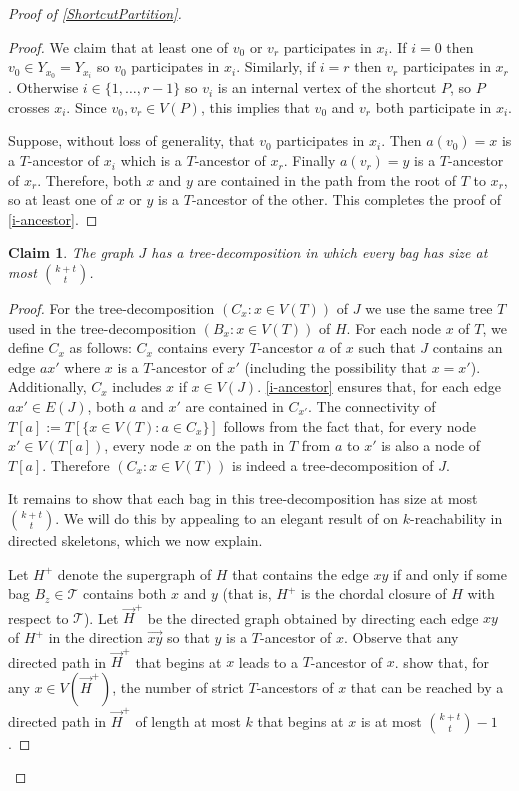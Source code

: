 \documentclass{patmorin}
\theoremstyle{plain}
\newtheorem{clm}{Claim}
\theoremstyle{definition}
\begin{document}
\begin{proof}[Proof of \cref{ShortcutPartition}]
\begin{proof}
  We claim that at least one of $v_0$ or $v_r$ participates in $x_i$.  If $i=0$ then $v_0\in Y_{x_0}=Y_{x_i}$ so $v_0$ participates in $x_i$. Similarly, if $i=r$ then $v_r$ participates in $x_r$.  Otherwise $i\in\{1,\ldots,r-1\}$ so $v_i$ is an internal vertex of the shortcut $P$, so $P$ crosses $x_i$.  Since $v_0,v_r\in V(P)$, this implies that $v_0$ and $v_r$ both participate in $x_i$.

  Suppose, without loss of generality, that $v_0$ participates in $x_i$.  Then $a(v_0)=x$ is a $T$-ancestor of $x_i$ which is a $T$-ancestor of $x_r$.  Finally $a(v_r)=y$ is a $T$-ancestor of $x_r$.  Therefore, both $x$ and $y$ are contained in the path from the root of $T$ to $x_r$, so at least one of $x$ or $y$ is a $T$-ancestor of the other.  This completes the proof of \cref{i-ancestor}.
\end{proof}

\begin{clm}
\label{general-bag-size}
The graph $J$ has a tree-decomposition in which every bag has size at most $\binom{k+t}{t}$.
\end{clm}

\begin{proof}
  For the tree-decomposition $(C_x:x\in V(T))$ of $J$ we use the same tree $T$ used in the tree-decomposition $(B_x:x\in V(T))$ of $H$. For each node $x$ of $T$, we define $C_x$ as follows: $C_x$ contains every $T$-ancestor $a$ of $x$ such that $J$ contains an edge $ax'$ where $x$ is a $T$-ancestor of $x'$ (including the possibility that $x=x'$).  Additionally, $C_x$ includes $x$ if $x\in V(J)$.
  \cref{i-ancestor} ensures that, for each edge $ax'\in E(J)$, both $a$ and $x'$ are contained in $C_{x'}$.  The connectivity of $T[a]:=T[\{x\in V(T):a\in C_x\}]$ follows from the fact that, for every node $x'\in V(T[a])$, every node $x$ on the path in $T$ from $a$ to  $x'$ is also a node of $T[a]$. Therefore $(C_x:x\in V(T))$ is indeed a tree-decomposition of $J$.

  It remains to show that each bag in this tree-decomposition has size at most $\binom{k+t}{t}$.  We will do this by appealing to an elegant result of \citet{PS21} on $k$-reachability in directed skeletons, which we now explain.

  Let $H^+$ denote the supergraph of $H$ that contains the edge $xy$ if and only if some bag $B_z\in\mathcal{T}$ contains both $x$ and $y$ (that is, $H^+$ is the chordal closure of $H$ with respect to $\mathcal{T}$).  Let $\overrightarrow{H}^+$ be the directed graph obtained by directing each edge $xy$ of $H^+$ in the direction $\overrightarrow{xy}$ so that $y$ is a $T$-ancestor of $x$. Observe that any directed path in $\overrightarrow{H}^+$ that begins at $x$ leads to a $T$-ancestor of $x$.  \citet[Lemma~13]{PS21} show that, for any $x\in V(\overrightarrow{H}^+)$, the number of strict $T$-ancestors of $x$ that can be reached by a directed path in $\overrightarrow{H}^+$ of length at most $k$ that begins at $x$ is at most $\binom{k+t}{t}-1$.


\end{proof}
\end{proof}
\end{document}
